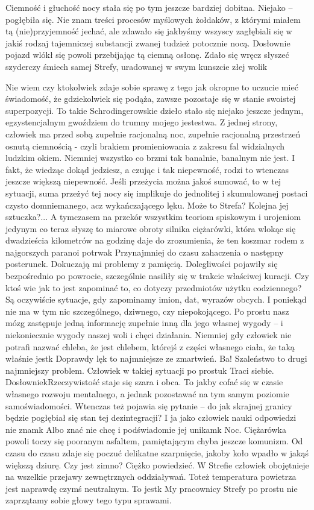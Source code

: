 \documentclass[../MAIN.tex]{subfiles}
\begin{document}
Ciemność i głuchość nocy stała się po tym jeszcze bardziej dobitna. Niejako -- pogłębiła się. Nie znam treści procesów myślowych żołdaków, z którymi miałem tą (nie)przyjemność jechać, ale zdawało się jakbyśmy wszyscy zagłębiali się w jakiś rodzaj tajemniczej substancji zwanej tudzież potocznie nocą. Dosłownie pojazd wlókł się powoli przebijając tą ciemną osłonę. Zdało się wręcz słyszeć szyderczy śmiech samej Strefy, uradowanej w swym kunszcie złej woli\3k

Nie wiem czy ktokolwiek zdaje sobie sprawę z tego jak okropne to uczucie mieć świadomość, że gdziekolwiek się podąża, zawsze pozostaje się w stanie swoistej superpozycji. To takie Schrodingerowskie dzieło stało się niejako jeszcze jednym, egzystencjalnym gwoździem do trumny mojego jestestwa. Z jednej strony, człowiek ma przed sobą zupełnie racjonalną noc, zupełnie racjonalną przestrzeń osnutą ciemnością - czyli brakiem promieniowania z zakresu fal widzialnych ludzkim okiem. Niemniej wszystko co brzmi tak banalnie, banalnym nie jest. I fakt, że wiedząc dokąd jedziesz, a czując i tak niepewność, rodzi to wtenczas jeszcze większą niepewność. Jeśli przeżycia można jakoś sumować, to w tej sytuacji, suma przeżyć tej nocy się implikuje do jednolitej i skumulowanej postaci czysto domniemanego, acz wykańczającego lęku. Może to Strefa? Kolejna jej sztuczka?... A tymczasem na przekór wszystkim teoriom spiskowym i urojeniom jedynym co teraz słyszę to miarowe obroty silnika ciężarówki, która wlokąc się dwadzieścia 
kilometrów na godzinę daje do zrozumienia, że ten koszmar rodem z najgorszych paranoi potrwa\3k Przynajmniej do czasu zahaczenia o następny posterunek.
% 
% 
Dokuczają mi problemy z pamięcią. Dolegliwości pojawiły się bezpośrednio po powrocie, szczególnie nasiliły się w trakcie właściwej kuracji. Czy ktoś wie jak to jest zapominać to, co dotyczy przedmiotów użytku codziennego? Są oczywiście sytuacje, gdy zapominamy imion, dat, wyrazów obcych. I poniekąd nie ma w tym nic szczególnego, dziwnego, czy niepokojącego. Po prostu nasz mózg zastępuje jedną informację zupełnie inną dla jego własnej wygody -- i niekoniecznie wygody naszej woli i chęci działania. Niemniej gdy człowiek nie potrafi nazwać chleba, że jest chlebem, którejś z części własnego ciała, że taką właśnie jest\3k Doprawdy lęk to najmniejsze ze zmartwień. Ba! Szaleństwo to drugi najmniejszy problem. Człowiek w takiej sytuacji po prostu\3k Traci siebie. Dosłownie\3kRzeczywistość staje się szara i obca. To jakby cofać się w czasie własnego rozwoju mentalnego, a jednak pozostawać na tym samym poziomie samoświadomości. Wtenczas też pojawia się pytanie -- do jak skrajnej granicy będzie pogłębiał się stan tej 
dezintegracji? I ja jako człowiek nauki odpowiedzi nie znam\3k Albo znać nie chcę i podświadomie jej unikam\3k
% 
Noc. Ciężarówka powoli toczy się pooranym asfaltem, pamiętającym chyba jeszcze komunizm. Od czasu do czasu zdaje się poczuć delikatne szarpnięcie, jakoby koło wpadło w jakąś większą dziurę. Czy jest zimno? Ciężko powiedzieć. W Strefie człowiek obojętnieje na wszelkie przejawy zewnętrznych oddziaływań. Toteż temperatura powietrza jest naprawdę czymś neutralnym. To jest\3k My pracownicy Strefy po prostu nie zaprzątamy sobie głowy tego typu sprawami.
\end{document}
